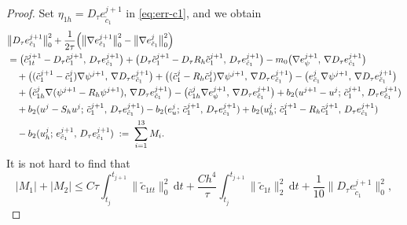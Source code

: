 \begin{proof}
Set $\eta_{1h} = D_{\tau}e_{\tilde{c}_{1}}^{j+1}$ in \eqref{eq:err-c1}, and we obtain
\begin{align}
  &\bigl\|D_{\tau}e_{\tilde{c}_{1}}^{j+1}\bigr\|_{0}^{2}
   + \frac{1}{2\tau}\Bigl(\bigl\|\nabla e_{\tilde{c}_{1}}^{j+1}\bigr\|_{0}^{2}
                         - \bigl\|\nabla e_{\tilde{c}_{1}}^{j}\bigr\|_{0}^{2}\Bigr)
  \nonumber\\
  &= \bigl(\tilde{c}_{1t}^{j+1} - D_{\tau}\tilde{c}_{1}^{j+1},\,
           D_{\tau}e_{\tilde{c}_{1}}^{j+1}\bigr)
   + \bigl(D_{\tau}\tilde{c}_{1}^{j+1} - D_{\tau}R_{h}\tilde{c}_{1}^{j+1},\,
           D_{\tau}e_{\tilde{c}_{1}}^{j+1}\bigr)
   - m_{0}\bigl(\nabla e_{\psi}^{j+1},\,
                 \nabla D_{\tau}e_{\tilde{c}_{1}}^{j+1}\bigr)
  \nonumber\\
  &\quad + \bigl((\tilde{c}_{1}^{j+1} - \tilde{c}_{1}^{j})\nabla\psi^{j+1},\,
               \nabla D_{\tau}e_{\tilde{c}_{1}}^{j+1}\bigr)
   + \bigl((\tilde{c}_{1}^{j} - R_{h}\tilde{c}_{1}^{j})\nabla\psi^{j+1},\,
           \nabla D_{\tau}e_{\tilde{c}_{1}}^{j+1}\bigr)
   - \bigl(e_{\tilde{c}_{1}}^{j}\nabla\psi^{j+1},\,
           \nabla D_{\tau}e_{\tilde{c}_{1}}^{j+1}\bigr)
  \nonumber\\
  &\quad + \bigl(\tilde{c}_{1h}^{j}\nabla(\psi^{j+1} - R_{h}\psi^{j+1}),\,
               \nabla D_{\tau}e_{\tilde{c}_{1}}^{j+1}\bigr)
   - \bigl(\tilde{c}_{1h}^{j}\nabla e_{\psi}^{j+1},\,
           \nabla D_{\tau}e_{\tilde{c}_{1}}^{j+1}\bigr)
   + b_{2}(u^{j+1}-u^{j};\, \tilde{c}_{1}^{j+1},\, D_{\tau}e_{\tilde{c}_{1}}^{j+1})
  \nonumber\\
  &\quad + b_{2}(u^{j} - S_{h}u^{j};\, \tilde{c}_{1}^{j+1},\, D_{\tau}e_{\tilde{c}_{1}}^{j+1})
   - b_{2}(e_{u}^{j};\, \tilde{c}_{1}^{j+1},\, D_{\tau}e_{\tilde{c}_{1}}^{j+1})
   + b_{2}(u_{h}^{j};\, \tilde{c}_{1}^{j+1} - R_{h}\tilde{c}_{1}^{j+1},\,
           D_{\tau}e_{\tilde{c}_{1}}^{j+1})
  \nonumber\\
  &\quad - b_{2}(u_{h}^{j};\, e_{\tilde{c}_{1}}^{j+1},\, D_{\tau}e_{\tilde{c}_{1}}^{j+1})
  \;:=\; \sum_{i=1}^{13}M_{i}.
  \label{eq:M-sum}
\end{align}
It is not hard to find that
\begin{equation}\label{eq:M1M2}
  |M_{1}| + |M_{2}|
  \leq C\tau\int_{t_{j}}^{t_{j+1}}\|\tilde{c}_{1tt}\|_{0}^{2}\,\mathrm{d}t
     + \frac{Ch^{4}}{\tau}\int_{t_{j}}^{t_{j+1}}\|\tilde{c}_{1t}\|_{2}^{2}\,\mathrm{d}t
     + \frac{1}{10}\bigl\|D_{\tau}e_{\tilde{c}_{1}}^{j+1}\bigr\|_{0}^{2},
\end{equation}

\end{proof}
